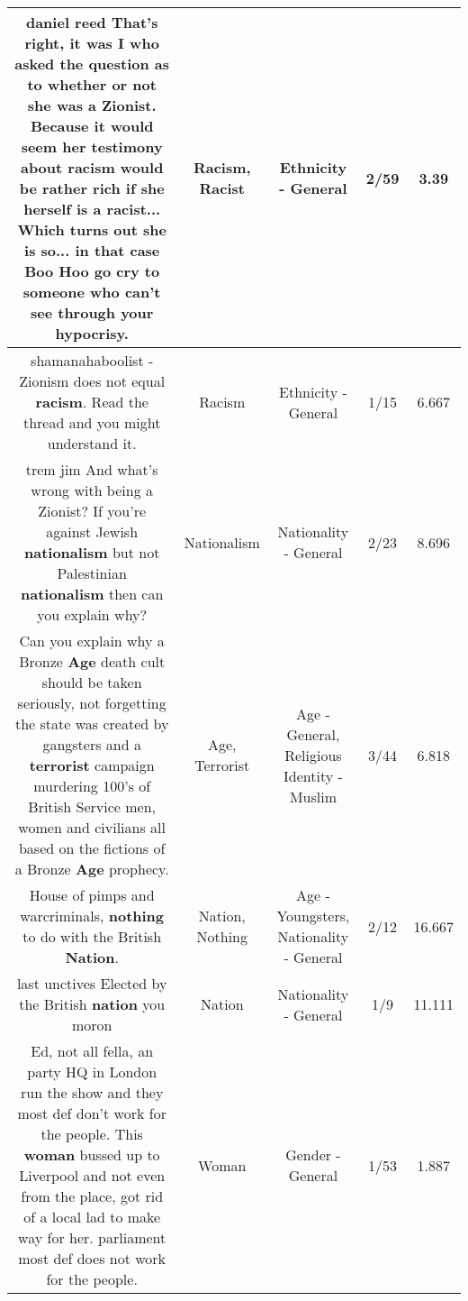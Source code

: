 \documentclass[11pt]{article}
\newlength\mylength
\begin{document}
\begin{center}
\begin{longtable}{|C{.65\mylength}|C{.30\mylength}|C{.12\mylength}|C{.12\mylength}|C{.12\mylength}|}
  \small daniel reed That's right, it was I who asked the question as to whether or not she was a Zionist. Because it would seem her testimony about \textbf{racism} would be rather rich if she herself is a \textbf{racist}... Which turns out she is so... in that case Boo Hoo go cry to someone who can't see through your hypocrisy.\normalsize   & Racism, Racist & Ethnicity - General & 2/59 & 3.39 \\  \hline
  \small shamanahaboolist - Zionism does not equal \textbf{racism}. Read the thread and you might understand it.\normalsize   & Racism & Ethnicity - General & 1/15 & 6.667 \\  \hline
  \small trem jim And what's wrong with being a Zionist? If you're against Jewish \textbf{nationalism} but not Palestinian \textbf{nationalism} then can you explain why?\normalsize   & Nationalism & Nationality - General & 2/23 & 8.696 \\  \hline
  \small Can you explain why a Bronze \textbf{Age} death cult should be taken seriously, not forgetting the state was created by gangsters and a \textbf{terrorist} campaign murdering 100's of British Service men, women and civilians all based on the fictions of a Bronze \textbf{Age} prophecy.\normalsize   & Age, Terrorist & Age - General, Religious Identity - Muslim & 3/44 & 6.818 \\  \hline
  \small House of pimps and warcriminals, \textbf{nothing} to do with the British \textbf{Nation}.\normalsize   & Nation, Nothing & Age - Youngsters, Nationality - General & 2/12 & 16.667 \\  \hline
  \small last unctives Elected by the British \textbf{nation} you moron\normalsize   & Nation & Nationality - General & 1/9 & 11.111 \\  \hline
  \small Ed, not all fella, an party HQ in London run the show and they most def don't work for the people. This \textbf{woman} bussed up to Liverpool and not even from the place, got rid of a local lad to make way for her. parliament most def does not work for the people.\normalsize   & Woman & Gender - General & 1/53 & 1.887 \\  \hline
  
\end{longtable}
\end{center}
\end{document}
